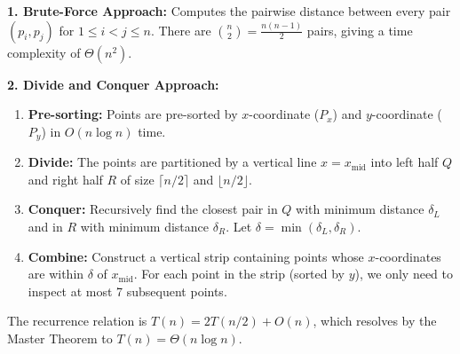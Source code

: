 \documentclass[12pt]{article}
\begin{document}
\textbf{1. Brute-Force Approach:} Computes the pairwise distance between every pair $(p_i, p_j)$ for $1 \le i < j \le n$. There are $\binom{n}{2} = \frac{n(n-1)}{2}$ pairs, giving a time complexity of $\Theta(n^2)$.

\textbf{2. Divide and Conquer Approach:}
\begin{enumerate}
    \item \textbf{Pre-sorting:} Points are pre-sorted by $x$-coordinate ($P_x$) and $y$-coordinate ($P_y$) in $O(n \log n)$ time.
    \item \textbf{Divide:} The points are partitioned by a vertical line $x = x_{\text{mid}}$ into left half $Q$ and right half $R$ of size $\lceil n/2 \rceil$ and $\lfloor n/2 \rfloor$.
    \item \textbf{Conquer:} Recursively find the closest pair in $Q$ with minimum distance $\delta_L$ and in $R$ with minimum distance $\delta_R$. Let $\delta = \min(\delta_L, \delta_R)$.
    \item \textbf{Combine:} Construct a vertical strip containing points whose $x$-coordinates are within $\delta$ of $x_{\text{mid}}$. For each point in the strip (sorted by $y$), we only need to inspect at most 7 subsequent points.
\end{enumerate}
The recurrence relation is $T(n) = 2T(n/2) + O(n)$, which resolves by the Master Theorem to $T(n) = \Theta(n \log n)$.
\end{document}
